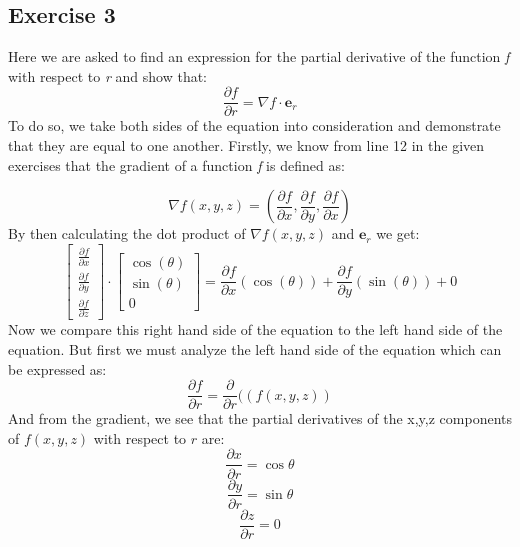 \documentclass{article}
\begin{document}
\subsection{Exercise 3}
Here we are asked to find an expression for the partial derivative of the function \emph{f} with respect to \emph{r} and show that:
\[\frac{\partial f}{\partial r} = \nabla f \cdot \mathbf{e}_r\]
To do so, we take both sides of the equation into consideration and demonstrate that they are equal to one another.
Firstly, we know from line 12 in the given exercises that the gradient of a function \emph{f} is defined as:

\begin{equation}
\nabla f(x,y,z) =( \frac{\partial f}{\partial x}, \frac{\partial f}{\partial y}, \frac{\partial f}{\partial x})
\end{equation}
By then calculating the dot product of $\nabla f(x,y,z)$ and $\mathbf{e}_r$ we get:
\begin{equation} \label{eq:23}
\left[\begin{array}{c}
\frac{\partial f}{\partial x} 
\\
 \frac{\partial f}{\partial y} 
\\
 \frac{\partial f}{\partial z} 
\end{array}\right]
\cdot
\left[\begin{array}{c}
\cos (\theta) 
\\
 \sin (\theta) 
\\
 0 
\end{array}\right]
= \frac{\partial f}{\partial x}(\cos (\theta))+\frac{\partial f}{\partial y}(\sin (\theta)) + 0
\end{equation}
Now we compare this right hand side of the equation to the left hand side of the equation. But first we must analyze the left hand side of the equation which can be expressed as: 
\begin{equation}
\frac{\partial f}{\partial r} = \frac{\partial }{\partial r} ((f(x,y,z))
\end{equation}
And from the gradient, we see that the partial derivatives of the x,y,z components of $f(x,y,z)$ with respect to $r$ are:
\begin{equation}
\frac{\partial x}{\partial r} = \cos \theta
\end{equation}
\begin{equation}
\frac{\partial y}{\partial r} = \sin \theta
\end{equation}
\begin{equation}
\frac{\partial z}{\partial r} = 0
\end{equation}
\end{document}
